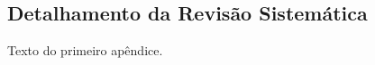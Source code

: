 \begin{apendicesenv}

\partapendices

\chapter{Detalhamento da Revisão Sistemática}

Texto do primeiro apêndice.

\end{apendicesenv}
